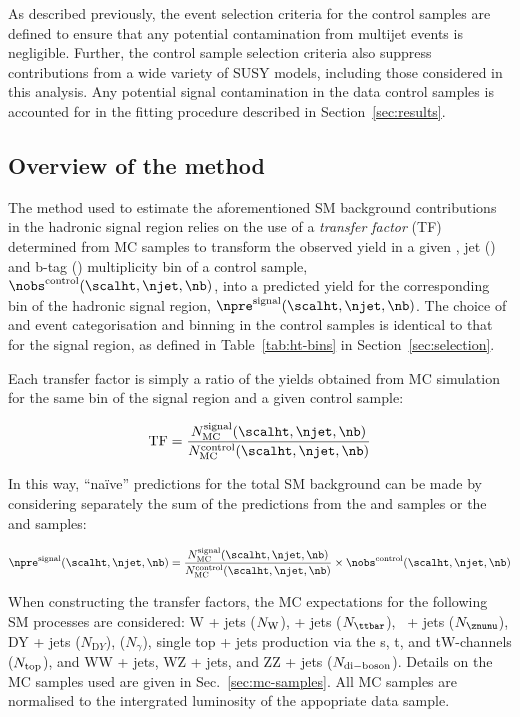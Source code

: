 As described previously, the event selection criteria for the control
samples are defined to ensure that any potential contamination from
multijet events is negligible. Further, the control sample selection
criteria also suppress contributions from a wide variety of SUSY
models, including those considered in this analysis. Any potential
signal contamination in the data control samples is accounted for in
the fitting procedure described in Section~\ref{sec:results}.

\subsection{Overview of the method\label{sec:background-method}}

The method used to estimate the aforementioned SM background
contributions in the hadronic signal region relies on the use of a
{\it transfer factor} (TF) determined from MC samples to transform the
observed yield in a given \scalht, jet (\njet) and b-tag (\nb)
multiplicity bin of a control sample, $\nobs^{\rm
  control}(\scalht,\njet,\nb)$, into a predicted yield for the
corresponding bin of the hadronic signal region, $\npre^{\rm
  signal}(\scalht,\njet,\nb)$. The choice of \njet and \nb event
categorisation and \scalht binning in the control samples is identical
to that for the signal region, as defined in Table~\ref{tab:ht-bins}
in Section~\ref{sec:selection}. 

Each transfer factor is simply a ratio of the yields obtained from MC
simulation for the same bin of the signal region and a given control
sample:

\begin{equation}
  \label{equ:tf-ratio}
  {\rm TF} = \frac{N_{\rm MC}^{\rm signal}(\scalht,\njet,\nb)}{N_{\rm
      MC}^{\rm control}(\scalht,\njet,\nb)} 
\end{equation}

In this way, ``na\"ive'' predictions for the total SM background can
be made by considering separately the sum of the predictions from the
\mj and \gj samples or the \mj and \mmj samples:

\begin{equation}
  \label{equ:pred-method}
  \npre^{\rm signal}(\scalht,\njet,\nb) = \frac{N_{\rm MC}^{\rm
      signal}(\scalht,\njet,\nb)}{N_{\rm MC}^{\rm
      control}(\scalht,\njet,\nb)} \times \nobs^{\rm
    control}(\scalht,\njet,\nb)   
\end{equation}

When constructing the transfer factors, the MC expectations for the
following SM processes are considered: W + jets ($N_{\rm W}$), \ttbar
+ jets ($N_{\ttbar}$), \znunu\ + jets ($N_{\znunu}$), DY + jets
($N_{\mathrm DY}$), \gj ($N_\gamma$), single top + jets
production via the s, t, and tW-channels ($N_{\rm top}$), and WW +
jets, WZ + jets, and ZZ + jets ($N_{\rm di-boson}$). Details on the MC
samples used are given in Sec.~\ref{sec:mc-samples}. All MC samples
are normalised to the intergrated luminosity of the appopriate data
sample.

